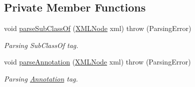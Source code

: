 \subsection*{Private Member Functions}
\begin{DoxyCompactItemize}
\item 
void \hyperlink{classunisys_1_1ChEBIOWLClass_ae682fc16d656c5970f82a66f061950dc}{parse\-Sub\-Class\-Of} (\hyperlink{structXMLNode}{X\-M\-L\-Node} xml)  throw (\-Parsing\-Error)
\begin{DoxyCompactList}\small\item\em Parsing Sub\-Class\-Of tag. \end{DoxyCompactList}\item 
void \hyperlink{classunisys_1_1ChEBIOWLClass_af23bf20388d5b25b4312fe2bedf6c3d6}{parse\-Annotation} (\hyperlink{structXMLNode}{X\-M\-L\-Node} xml)  throw (\-Parsing\-Error)
\begin{DoxyCompactList}\small\item\em Parsing \hyperlink{classunisys_1_1Annotation}{Annotation} tag. \end{DoxyCompactList}\end{DoxyCompactItemize}
